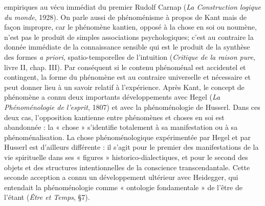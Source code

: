 empiriques au vécu immédiat du premier
Rudolf Carnap ({\it La Construction logique
du monde}, 1928). On parle aussi de phénoménisme
à propos de Kant mais de
façon impropre, car le phénomène kantien,
opposé à la chose en soi ou noumène,
n’est pas le produit de simples
associations psychologiques; c’est au
contraire la donnée immédiate de la
connaissance sensible qui est le produit de
la synthèse des formes {\it a priori}, spatio-temporelles
de l'intuition ({\it Critique de la
raison pure}, livre II, chap. III). Par conséquent
si le contenu phénoménal est accidentel
et contingent, la forme du
phénomène est au contraire universelle et
nécessaire et peut donner lieu à un savoir
relatif à l’expérience. Après Kant, le
concept de phénomène a connu deux
importants développements avec Hegel
({\it La Phénoménologie de l'esprit}, 1807) et
avec la phénoménologie de Husserl. Dans
ces deux cas, l'opposition kantienne entre
phénomènes et choses en soi est abandonnée :
la « chose » s’identifie totalement à
sa manifestation ou à sa phénoménalisation.
La chose phénoménologique expérimentée
par Hegel et par Husserl est
d’ailleurs différente : il s’agit pour le premier
des manifestations de la vie spirituelle
dans ses « figures » historico-dialectiques,
et pour le second des objets
et des structures intentionnelles de la
conscience transcendantale. Cette
seconde acception a connu un développement
ultérieur avec Heidegger, qui entendait
la phénoménologie comme
« ontologie fondamentale » de l'être de
l'étant ({\it Être et Temps}, \S 7).


